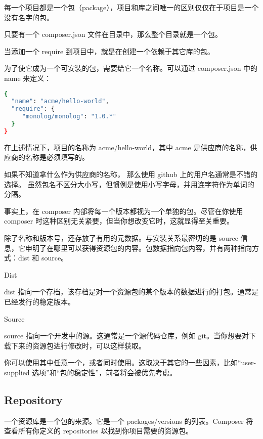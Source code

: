 每一个项目都是一个包（package），项目和库之间唯一的区别仅仅在于项目是一个没有名字的包。



只要有一个 composer.json 文件在目录中，那么整个目录就是一个包。

当添加一个 require 到项目中，就是在创建一个依赖于其它库的包。


为了使它成为一个可安装的包，需要给它一个名称。可以通过 composer.json 中的 name 来定义：



\begin{lstlisting}[language=bash]
{
  "name": "acme/hello-world",
  "require": {
     "monolog/monolog": "1.0.*"
  }
}
\end{lstlisting}


在上述情况下，项目的名称为 acme/hello-world，其中 acme 是供应商的名称，供应商的名称是必须填写的。


如果不知道拿什么作为供应商的名称， 那么使用 github 上的用户名通常是不错的选择。 虽然包名不区分大小写，但惯例是使用小写字母，并用连字符作为单词的分隔。

事实上，在 composer 内部将每一个版本都视为一个单独的包。尽管在你使用 composer 时这种区别无关紧要，但当你想改变它时，这就显得至关重要。

除了名称和版本号，还存放了有用的元数据。与安装关系最密切的是 source 信息，它申明了在哪里可以获得资源包的内容。包数据指向包内容，并有两种指向方式：dist 和 source。

\begin{compactitem}
\item Dist

dist 指向一个存档，该存档是对一个资源包的某个版本的数据进行的打包。通常是已经发行的稳定版本。

\item Source

source 指向一个开发中的源。这通常是一个源代码仓库，例如 git。当你想要对下载下来的资源包进行修改时，可以这样获取。
\end{compactitem}

你可以使用其中任意一个，或者同时使用。这取决于其它的一些因素，比如“user-supplied 选项”和“包的稳定性”，前者将会被优先考虑。

\subsection{Repository}

一个资源库是一个包的来源。它是一个 packages/versions 的列表。Composer 将查看所有你定义的 repositories 以找到你项目需要的资源包。

